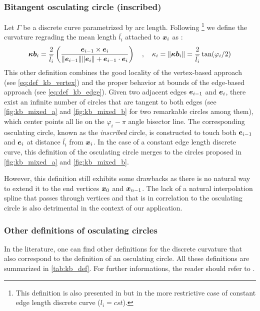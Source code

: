 \subsubsection{Bitangent osculating circle (inscribed)}
Let $\Gamma$ be a discrete curve parametrized by arc length. Following \cite{Vouga2014}\footnote{This definition is also presented in \cite{Bobenko2015, Carroll2014} but in the more restrictive case of constant edge length discrete curve ($l_i = cst$).} we define the curvature regrading the mean length $\overbar{l_i}$ attached to $\boldsymbol{x}_{i}$ as :
\begin{equation}
	\vect{\kappa b}_i = \frac{2}{\overbar{l_i}} \left( \frac{\vect{e}_{i-1} \times \vect{e}_{i}}{\norm{\vect{e}_{i-1}} \norm{\vect{e}_{i}} + \vect{e}_{i-1} \cdot \vect{e}_{i}} \right)
	\quad , \quad
	\kappa_i = \norm{\vect{\kappa b}_i} = \frac{2}{\overbar{l_i}} \tan(\varphi_i/2)
\end{equation}
This other definition combines the good locality of the vertex-based approach (see \cref{eq:def_kb_vertex}) and the proper behavior at bounds of the edge-based approach (see \cref{eq:def_kb_edge}). Given two adjacent edges $\boldsymbol{e}_{i-1}$ and $\boldsymbol{e}_{i}$, there exist an infinite number of circles that are tangent to both edges (see \cref{fig:kb_mixed_a} and \cref{fig:kb_mixed_b} for two remarkable circles among them), which center points all lie on the $\varphi_i-\pi$ angle bisector line. The corresponding osculating circle, known as the \emph{inscribed} circle, is constructed to touch both $\boldsymbol{e}_{i-1}$ and $\boldsymbol{e}_{i}$ at distance $\overbar{l_i}$ from $\boldsymbol{x}_{i}$. In the case of a constant edge length discrete curve, this definition of the osculating circle merges to the circles proposed in \cref{fig:kb_mixed_a} and \cref{fig:kb_mixed_b}.

However, this definition still exhibits some drawbacks as there is no natural way to extend it to the end vertices $\boldsymbol{x}_{0}$ and $\boldsymbol{x}_{n-1}$. The lack of a natural interpolation spline that passes through vertices and that is in correlation to the osculating circle is also detrimental in the context of our application.

\subsubsection{Other definitions of osculating circles}
In the literature, one can find other definitions for the discrete curvature that also correspond to the definition of an osculating circle. All these definitions are summarized in \cref{tab:kb_def}. For further informations, the reader should refer to \cite{Carroll2014, Vouga2014, Bobenko2015, Romon2013}.

